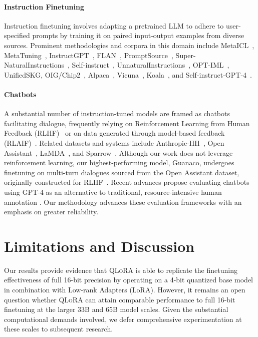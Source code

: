 \paragraph{Instruction Finetuning} Instruction finetuning involves adapting a pretrained LLM to adhere to user-specified prompts by training it on paired input-output examples from diverse sources. Prominent methodologies and corpora in this domain include MetaICL~\citep{min2021metaicl}, MetaTuning~\citep{zhong2021adapting}, InstructGPT~\citep{ouyang2022training}, FLAN~\citep{wei2021finetuned,chung2022scaling}, PromptSource~\citep{bach2022promptsource}, Super-NaturalInstructions~\citep{wang2022super,sanh2021multitask}, Self-instruct~\citep{wang2022self}, UnnaturalInstructions~\citep{honovich2022unnatural}, OPT-IML~\citep{iyer2022opt}, UnifiedSKG\citep{xie2022unifiedskg}, OIG/Chip2~\citep{laion2023}, Alpaca~\citep{alpaca}, Vicuna~\citep{vicuna2023}, Koala~\citep{koala_blogpost_2023}, and Self-instruct-GPT-4~\citep{peng2023instruction}.

\paragraph{Chatbots} A substantial number of instruction-tuned models are framed as chatbots facilitating dialogue, frequently relying on Reinforcement Learning from Human Feedback (RLHF)~\citep{christiano2017deep} or on data generated through model-based feedback (RLAIF)~\citep{bai2022constitutional}. Related datasets and systems include Anthropic-HH~\citep{askell2021general,bai2022training}, Open Assistant~\citep{kopf2023openassistant}, LaMDA~\citep{thoppilan2022lamda}, and Sparrow~\citep{glaese2022improving}. Although our work does not leverage reinforcement learning, our highest-performing model, Guanaco, undergoes finetuning on multi-turn dialogues sourced from the Open Assistant dataset, originally constructed for RLHF~\citep{kopf2023openassistant}. Recent advances propose evaluating chatbots using GPT-4 as an alternative to traditional, resource-intensive human annotation \citep{vicuna2023,peng2023instruction}. Our methodology advances these evaluation frameworks with an emphasis on greater reliability.

\section{Limitations and Discussion}

Our results provide evidence that \textsc{QLoRA} is able to replicate the finetuning effectiveness of full 16-bit precision by operating on a 4-bit quantized base model in combination with Low-rank Adapters (LoRA). However, it remains an open question whether \textsc{QLoRA} can attain comparable performance to full 16-bit finetuning at the larger 33B and 65B model scales. Given the substantial computational demands involved, we defer comprehensive experimentation at these scales to subsequent research.

